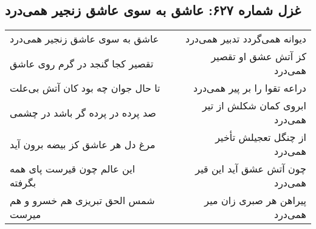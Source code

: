 \begin{center}
\section*{غزل شماره ۶۲۷: عاشق به سوی عاشق زنجیر همی‌درد}
\label{sec:0627}
\begin{longtable}{l p{0.5cm} r}
عاشق به سوی عاشق زنجیر همی‌درد
&&
دیوانه همی‌گردد تدبیر همی‌درد
\\
تقصیر کجا گنجد در گرم روی عاشق
&&
کز آتش عشق او تقصیر همی‌درد
\\
تا حال جوان چه بود کان آتش بی‌علت
&&
دراعه تقوا را بر پیر همی‌درد
\\
صد پرده در پرده گر باشد در چشمی
&&
ابروی کمان شکلش از تیر همی‌درد
\\
مرغ دل هر عاشق کز بیضه برون آید
&&
از چنگل تعجیلش تأخیر همی‌درد
\\
این عالم چون قیرست پای همه بگرفته
&&
چون آتش عشق آید این قیر همی‌درد
\\
شمس الحق تبریزی هم خسرو و هم میرست
&&
پیراهن هر صبری زان میر همی‌درد
\\
\end{longtable}
\end{center}
